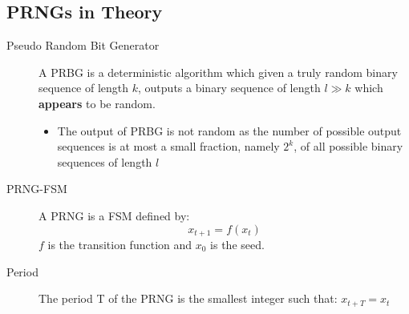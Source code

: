 \subsection{PRNGs in Theory}
\begin{description}
    \item[Pseudo Random Bit Generator] A PRBG is a deterministic algorithm
        which given a truly random binary sequence of length $k$, outputs a binary
        sequence of length $l \gg k $ which \textbf{appears} to be random. 
        \begin{center}
        \end{center}

        \begin{itemize}
            \item The output of PRBG is not random as the number of
                possible output sequences is at most a small
                fraction, namely $2^k$, of all possible binary
                sequences of length $l$
        \end{itemize}

    \item[PRNG-FSM] A PRNG is a FSM defined by: $$x_{t+1} = f(x_t)$$ 
        $f$ is the transition function and $x_0$ is the seed.
    \item[Period] The period T of the PRNG is the smallest integer such that:
        $x_{t+T} = x_t$
\end{description}

